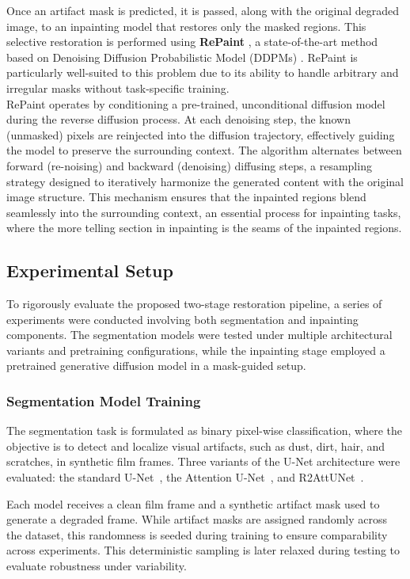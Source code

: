 \documentclass[10pt,a4paper,twocolumn,twoside]{article}
\begin{document}
Once an artifact mask is predicted, it is passed, along with the original degraded image, to an inpainting model that restores only the masked regions. This selective restoration is performed using \textbf{RePaint} \cite{repaint}, a state-of-the-art method based on Denoising Diffusion Probabilistic Model (DDPMs) \cite{ddpm}. RePaint is particularly well-suited to this problem due to its ability to handle arbitrary and irregular masks without task-specific training.\\
RePaint operates by conditioning a pre-trained, unconditional diffusion model during the reverse diffusion process. At each denoising step, the known (unmasked) pixels are reinjected into the diffusion trajectory, effectively guiding the model to preserve the surrounding context. The algorithm alternates between forward (re-noising) and backward (denoising) diffusing steps, a resampling strategy designed to iteratively harmonize the generated content with the original image structure. This mechanism ensures that the inpainted regions blend seamlessly into the surrounding context, an essential process for inpainting tasks, where the more telling section in inpainting is the seams of the inpainted regions.
\subsection{Experimental Setup}

To rigorously evaluate the proposed two-stage restoration pipeline, a series of experiments were conducted involving both segmentation and inpainting components. The segmentation models were tested under multiple architectural variants and pretraining configurations, while the inpainting stage employed a pretrained generative diffusion model in a mask-guided setup.

\subsubsection{Segmentation Model Training}

The segmentation task is formulated as binary pixel-wise classification, where the objective is to detect and localize visual artifacts, such as dust, dirt, hair, and scratches, in synthetic film frames. Three variants of the U-Net architecture were evaluated: the standard U-Net~\cite{unet}, the Attention U-Net~\cite{attunet}, and R2AttUNet~\cite{r2attunet}.

Each model receives a clean film frame and a synthetic artifact mask used to generate a degraded frame. While artifact masks are assigned randomly across the dataset, this randomness is seeded during training to ensure comparability across experiments. This deterministic sampling is later relaxed during testing to evaluate robustness under variability.
\end{document}
